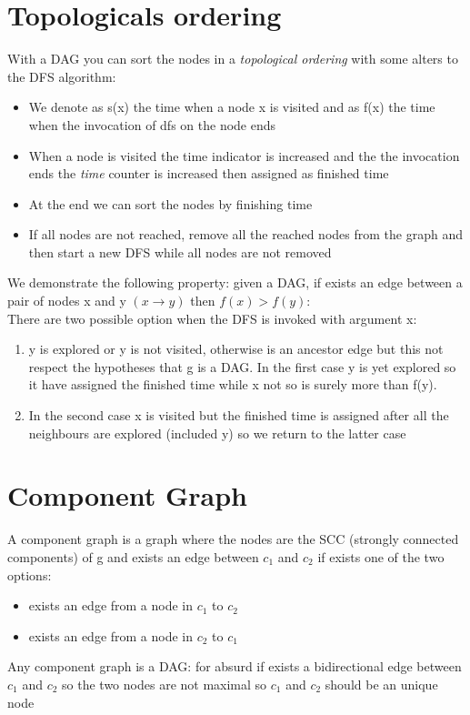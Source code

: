 \documentclass[10pt,a4paper]{book}
\begin{document}
			\section{Topologicals ordering}
			With a DAG you can sort the nodes in a \textit{topological ordering} with some alters to the DFS algorithm: 
			\begin{itemize}
				\item 	We denote as s(x) the time when a node x is visited and as f(x) the time when the invocation of dfs on the node ends
				\item When a node is visited the time indicator is increased and the the invocation ends the \textit{time} counter is increased then assigned as finished time
				\item At the end we can sort the nodes by finishing time
				\item If all nodes are not reached, remove all the reached nodes from the graph and then start a new DFS while all nodes are not removed
			\end{itemize}
			We demonstrate the following property: given a DAG, if exists an edge between a pair of nodes x and y $ (x \rightarrow y)  $ then $  f(x) > f(y) $:\\
			There are two possible option when the DFS is invoked with argument x: 
			\begin{enumerate}
				\item y is explored or y is not visited, otherwise is an ancestor edge but this not respect the hypotheses that g is a DAG. In the first case y is yet explored so it have assigned the  finished time while x not so is surely more than f(y).
				\item In the second case x is visited but the finished time is assigned after all the neighbours are explored (included y) so we return to the latter case
			\end{enumerate}
			\section{Component Graph}
			A component graph is a graph where the nodes are the SCC (strongly connected components) of g and exists an edge between $ c_1 $ and $ c_2 $ if exists one of the two options:
			\begin{itemize}
				\item exists an edge from a node in $ c_1 $ to $ c_2 $
				\item exists an edge from a node in $ c_2 $ to $ c_1 $
			\end{itemize}
			Any component graph is a DAG: for absurd if exists a bidirectional edge between $ c_1 $ and $ c_2 $ so the two nodes are not maximal so $ c_1 $ and $ c_2 $ should be an unique node
\end{document}
